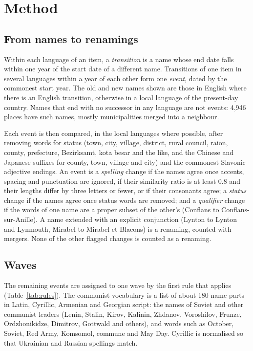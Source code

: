 \documentclass[11pt,a4paper]{article}
\begin{document}
\section{Method}
\subsection{From names to renamings}
Within each language of an item, a \emph{transition} is a name whose end date falls within one year of the start date of a different name. Transitions of one item in several languages within a year of each other form one \emph{event}, dated by the commonest start year. The old and new names shown are those in English where there is an English transition, otherwise in a local language of the present-day country. Names that end with no successor in any language are not events: 4,946 places have such names, mostly municipalities merged into a neighbour.

Each event is then compared, in the local languages where possible, after removing words for status (town, city, village, district, rural council, raion, county, prefecture, Bezirksamt, kota besar and the like, and the Chinese and Japanese suffixes for county, town, village and city) and the commonest Slavonic adjective endings. An event is a \emph{spelling} change if the names agree once accents, spacing and punctuation are ignored, if their similarity ratio is at least 0.8 and their lengths differ by three letters or fewer, or if their consonants agree; a \emph{status} change if the names agree once status words are removed; and a \emph{qualifier} change if the words of one name are a proper subset of the other's (Conflans to Conflans-sur-Anille). A name extended with an explicit conjunction (Lynton to Lynton and Lynmouth, Mirabel to Mirabel-et-Blacons) is a renaming, counted with mergers. None of the other flagged changes is counted as a renaming.

\subsection{Waves}
The remaining events are assigned to one wave by the first rule that applies (Table~\ref{tab:rules}). The communist vocabulary is a list of about 180 name parts in Latin, Cyrillic, Armenian and Georgian script: the names of Soviet and other communist leaders (Lenin, Stalin, Kirov, Kalinin, Zhdanov, Voroshilov, Frunze, Ordzhonikidze, Dimitrov, Gottwald and others), and words such as October, Soviet, Red Army, Komsomol, commune and May Day. Cyrillic is normalised so that Ukrainian and Russian spellings match.
\end{document}
